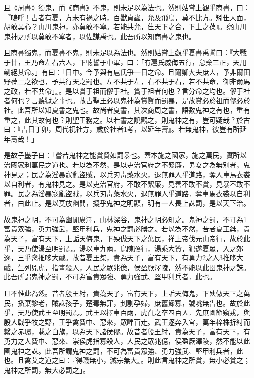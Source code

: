 \begin{pinyinscope}
且《周書》獨鬼，而《商書》不鬼，則未足以為法也。然則姑嘗上觀乎商書，曰：『嗚呼！古者有夏，方未有禍之時，百獸貞蟲，允及飛鳥，莫不比方。矧隹人面，胡敢異心？山川鬼神，亦莫敢不寧。若能共允，隹天下之合，下土之葆』。察山川鬼神之所以莫敢不寧者，以佐謀禹也。此吾所以知商書之鬼也。

且商書獨鬼，而夏書不鬼，則未足以為法也。然則姑嘗上觀乎夏書禹誓曰：『大戰于甘，王乃命左右六人，下聽誓于中軍，曰：「有扈氏威侮五行，怠棄三正，天用劋絕其命。」有曰：「日中。今予與有扈氏爭一日之命。且爾卿大夫庶人，予非爾田野葆士之欲也，予共行天之罰也。左不共于左，右不共于右，若不共命，御非爾馬之政，若不共命」』。是以賞于祖而僇于社。賞于祖者何也？言分命之均也。僇于社者何也？言聽獄之事也。故古聖王必以鬼神為賞賢而罰暴，是故賞必於祖而僇必於社。此吾所以知夏書之鬼也。故尚者夏書，其次商周之書，語數鬼神之有也，重有重之，此其故何也？則聖王務之。以若書之說觀之，則鬼神之有，豈可疑哉？於古曰：『吉日丁卯，周代祝社方，歲於社者1考，以延年壽』。若無鬼神，彼豈有所延年壽哉！」

是故子墨子曰：「嘗若鬼神之能賞賢如罰暴也。蓋本施之國家，施之萬民，實所以治國家利萬民之道也。若以為不然，是以吏治官府之不絜廉，男女之為無別者，鬼神見之；民之為淫暴寇亂盜賊，以兵刃毒藥水火，退無罪人乎道路，奪人車馬衣裘以自利者，有鬼神見之。是以吏治官府，不敢不絜廉，見善不敢不賞，見暴不敢不罪。民之為淫暴寇亂盜賊，以兵刃毒藥水火，退無罪人乎道路，奪車馬衣裘以自利者，由此止。是以莫放幽閒，擬乎鬼神之明顯，明有一人畏上誅罰，是以天下治。

故鬼神之明，不可為幽閒廣澤，山林深谷，鬼神之明必知之。鬼神之罰，不可為1富貴眾強，勇力強武，堅甲利兵，鬼神之罰必勝之。若以為不然，昔者夏王桀，貴為天子，富有天下，上詬天侮鬼，下殃傲天下之萬民，祥上帝伐元山帝行，故於此乎，天乃使湯至明罰焉。湯以車九兩，鳥陳鴈行，湯乘大贊，犯遂夏眾，入之郊逐，王乎禽推哆大戲。故昔夏王桀，貴為天子，富有天下，有勇力2之人3推哆大戲，生列兕虎，指畫殺人，人民之眾兆億，侯盈厥澤陵，然不能以此圉鬼神之誅。此吾所謂鬼神之罰，不可為富貴眾強、勇力強武、堅甲利兵者，此也。

且不惟此為然。昔者殷王紂，貴為天子，富有天下，上詬天侮鬼，下殃傲天下之萬民，播棄黎老，賊誅孩子，楚毒無罪，刲剔孕婦，庶舊鰥寡，號咷無告也。故於此乎，天乃使武王至明罰焉。武王以擇車百兩，虎賁之卒四百人，先庶國節窺戎，與殷人戰乎牧之野，王乎禽費中、惡來，眾畔百走。武王逐奔入宮，萬年梓株折紂而繫之赤環，載之白旗，以為天下諸侯僇。故昔者殷王紂，貴為天子，富有天下，有勇力之人費中、惡來、崇侯虎指寡殺人，人民之眾兆億，侯盈厥澤陵，然不能以此圉鬼神之誅。此吾所謂鬼神之罰，不可為富貴眾強、勇力強武、堅甲利兵者，此也。且禽艾之道之曰：『得璣無小，滅宗無大』。則此言鬼神之所賞，無小必賞之；鬼神之所罰，無大必罰之」。


\end{pinyinscope}
